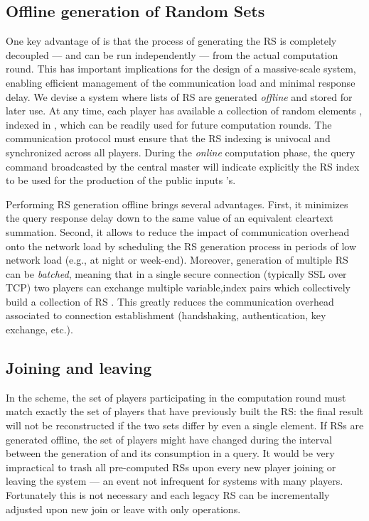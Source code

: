 \documentclass{sig-alternate}
\begin{document}
\subsection{Offline generation of Random Sets} 
One key advantage of \ata is that the process of generating the RS is completely decoupled --- and can be run independently --- from the actual computation round.
 This  has important implications for the design of a massive-scale system, enabling efficient management of  the communication load and minimal response delay. 
We devise  a system where lists of RS are generated {\em offline} and stored for later use. 
At any time, each player  has available a collection of random elements , indexed in , which can be readily used for future computation rounds. 
The communication protocol must ensure that the RS indexing is univocal and synchronized across all players. 
During the {\em online} computation phase, the query command broadcasted by the central master will indicate explicitly the RS index to be used for the production of the public inputs 's. 

Performing  RS generation offline brings several advantages. First, it minimizes the query response delay down to the same value of an equivalent cleartext summation.
Second, it allows to reduce the impact of communication overhead onto the network load by scheduling the RS generation process in periods of low network load (e.g., at night or week-end). Moreover, generation of multiple RS can be {\em batched}, meaning that in a single secure connection (typically SSL over TCP) two players can exchange multiple variable,index pairs   which collectively build a collection of RS . This greatly reduces the communication overhead associated to connection establishment (handshaking, authentication, key exchange, etc.).\\


\subsection{Joining and leaving}
In the \ata scheme, the set of players participating in the computation round must match exactly the set of players that have previously built the RS: the final result will not be reconstructed if the two sets differ by even a single element.
If RSs are generated offline,  the set of players might have changed during the interval between the generation of   and its consumption in a query.
It would be very impractical to trash all pre-computed RSs upon every new player joining or leaving the system --- an event not infrequent for systems with many players.
Fortunately this is not necessary and each legacy RS can be incrementally adjusted upon new join or leave with only  operations.
\end{document}
